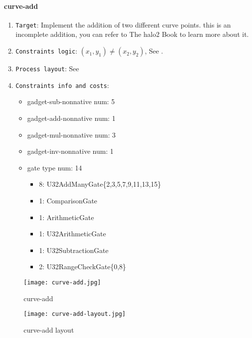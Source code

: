 \paragraph{curve-add}

\begin{enumerate}
    \item \verb|Target|: Implement the addition of two different curve points. this is an incomplete addition, you can refer to The halo2 Book \cite{website:halo2-book} to learn more about it.
    \item \verb|Constraints logic|: $(x_1,y_1) \ne (x_2,y_2)$, See .
    \item \verb|Process layout|: See 
    \item \verb|Constraints info and costs|:
    \begin{itemize}
        \item gadget-sub-nonnative num: 5
        \item gadget-add-nonnative num: 1
        \item gadget-mul-nonnative num: 3
        \item gadget-inv-nonnative num: 1
        \item gate type num: 14
            \begin{itemize}
                \item 8: U32AddManyGate\{2,3,5,7,9,11,13,15\}
                \item 1: ComparisonGate
                \item 1: ArithmeticGate
                \item 1: U32ArithmeticGate
                \item 1: U32SubtractionGate
                \item 2: U32RangeCheckGate\{0,8\}
            \end{itemize}
    \end{itemize}
\end{enumerate}

\begin{figure}[!ht]
    \centering
    \texttt{[image: curve-add.jpg]}
    \caption{curve-add}
    \label{fig:curve-add}
\end{figure}

\begin{figure}[!ht]
    \centering
    \texttt{[image: curve-add-layout.jpg]}
    \caption{curve-add layout}
    \label{fig:curve-add-layout}
\end{figure}